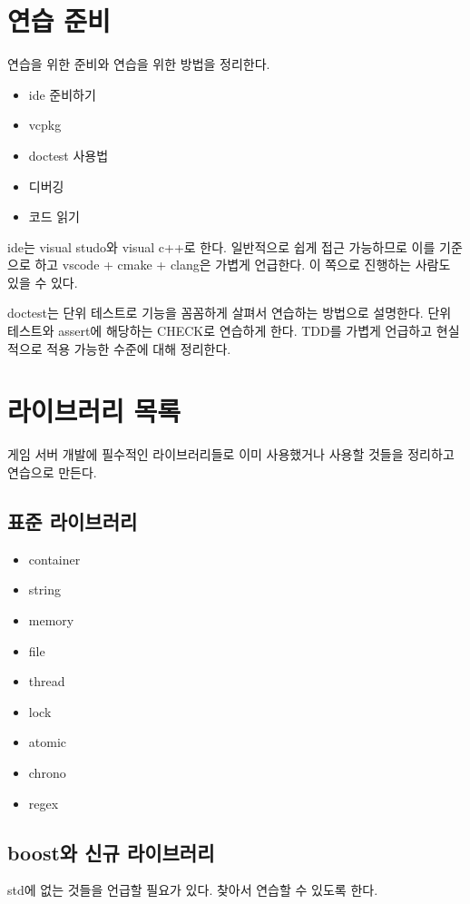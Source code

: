 \chapter{연습 준비}

연습을 위한 준비와 연습을 위한 방법을 정리한다. 

\begin{itemize}
    \item ide 준비하기 
    \item vcpkg
    \item doctest 사용법
    \item 디버깅 
    \item 코드 읽기 
\end{itemize}

ide는 visual studo와 visual c++로 한다. 일반적으로 쉽게 접근 가능하므로 이를 기준으로 
하고 vscode + cmake + clang은 가볍게 언급한다. 이 쪽으로 진행하는 사람도 있을 수 있다. 

doctest는 단위 테스트로 기능을 꼼꼼하게 살펴서 연습하는 방법으로 설명한다. 
단위 테스트와 assert에 해당하는 CHECK로 연습하게 한다. TDD를 가볍게 언급하고 현실적으로 
적용 가능한 수준에 대해 정리한다. 

\chapter{라이브러리 목록}

게임 서버 개발에 필수적인 라이브러리들로 이미 사용했거나 사용할 것들을 
정리하고 연습으로 만든다. 

\section{표준 라이브러리}

\begin{itemize}
    \item container 
    \item string 
    \item memory 
    \item file 
    \item thread 
    \item lock
    \item atomic
    \item chrono 
    \item regex 
\end{itemize}

\section{boost와 신규 라이브러리}
std에 없는 것들을 언급할 필요가 있다. 찾아서 연습할 수 있도록 한다. 

